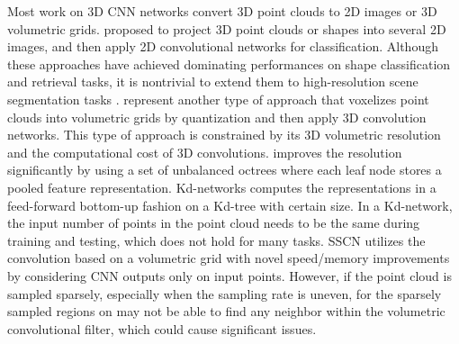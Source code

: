 \documentclass[10pt,twocolumn,letterpaper]{article}
\begin{document}
Most work on 3D CNN networks convert 3D point clouds to 2D images or 3D volumetric grids. \cite{su2015multi,qi2016volumetric} proposed to project 3D point clouds or shapes into several 2D images, and then apply 2D convolutional networks for classification. Although these approaches have achieved dominating performances on shape classification and retrieval tasks, it is nontrivial to extend them to high-resolution scene segmentation tasks \cite{dai2017scannet}. \cite{wu20153d,maturana2015voxnet,qi2016volumetric} represent another type of approach that voxelizes point clouds into volumetric grids by quantization and then apply 3D convolution networks. This type of approach is constrained by its 3D volumetric resolution and the computational cost of 3D convolutions. \cite{riegler2017octnet} improves the resolution significantly by using a set of unbalanced octrees where each leaf node stores a pooled feature representation. Kd-networks\cite{klokov2017escape} computes the representations in a feed-forward bottom-up fashion on a Kd-tree with certain size. In a Kd-network, the input number of points in the point cloud needs to be the same during training and testing, which does not hold for many tasks. SSCN \cite{graham2017submanifold} utilizes the convolution based on a volumetric grid with novel speed/memory improvements by considering CNN outputs only on input points. However, if the point cloud is sampled sparsely, especially when the sampling rate is uneven, for the sparsely sampled regions on may not be able to find any neighbor within the volumetric convolutional filter, which could cause significant issues. 
\end{document}
